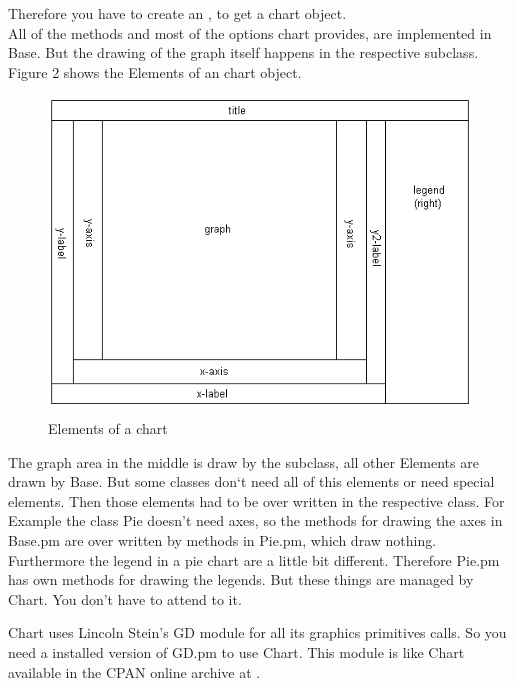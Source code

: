 Therefore you have to create an , to get a chart object.\\
All of the methods and most of the options chart provides, are implemented in Base. But the drawing of the graph itself happens in the respective subclass. Figure 2 shows the Elements of an chart object.\\  
\begin{figure}[h]
	\begin{center}
		\includegraphics[scale=0.4]{Elemente.png}
	\end{center}
	\caption{Elements of a chart}
	\label{fig:Elemente}
\end{figure}
The graph area in the middle is draw by the subclass, all other Elements are drawn by Base. But some classes don`t need all of this elements or need special elements. Then those elements had to be over written in the respective class. For Example the class Pie doesn't need axes, so the methods for drawing the axes in Base.pm are over written by methods in Pie.pm, which draw nothing. Furthermore the legend in a pie chart are a little bit different. Therefore Pie.pm has own methods for drawing the legends. But these things are managed by Chart. You don't have to attend to it. \par
Chart uses Lincoln Stein's GD module for all its graphics primitives calls. So you need a installed version of GD.pm to use Chart. This module is like Chart available in the CPAN online archive at . \\       